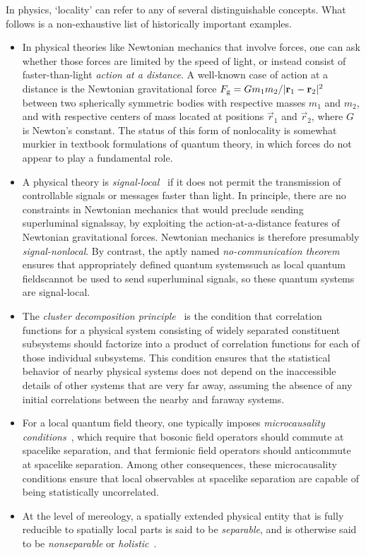 \documentclass[twoside,twocolumn,english,prl,superscriptaddress,nobibnotes,nofootinbib]{revtex4-2}
\begin{document}
In physics, \textquoteleft locality\textquoteright{} can refer to
any of several distinguishable concepts. What follows is a non-exhaustive
list of historically important examples.
\begin{itemize}
\item In physical theories like Newtonian mechanics that involve forces,
one can ask whether those forces are limited by the speed of light,
or instead consist of faster-than-light \emph{action at a distance}.
A well-known case of action at a distance is the Newtonian gravitational
force $F_{\textrm{g}}=Gm_{1}m_{2}/\vert\mathbf{r}_{1}-\mathbf{r}_{2}\vert^{2}$
between two spherically symmetric bodies with respective masses $m_{1}$
and $m_{2}$, and with respective centers of mass located at positions
$\vec r_{1}$ and $\vec r_{2}$, where $G$ is Newton's constant.
The status of this form of nonlocality is somewhat murkier in textbook
formulations of quantum theory, in which forces do not appear to play
a fundamental role.
\item A physical theory is \emph{signal-local}~\citep{Skyrms:1982cdalc,Skyrms:1984elfm}
if it does not permit the transmission of controllable signals or
messages faster than light. In principle, there are no constraints
in Newtonian mechanics that would preclude sending superluminal signals\textemdash say,
by exploiting the action-at-a-distance features of Newtonian gravitational
forces. Newtonian mechanics is therefore presumably \emph{signal-nonlocal}.
By contrast, the aptly named \emph{no-communication theorem}~\citep{GhirardiRiminiWeber:1980agaastttqmmp,Jordan:1983qcdnts}
ensures that appropriately defined quantum systems\textemdash such
as local quantum fields\textemdash cannot be used to send superluminal
signals, so these quantum systems are signal-local.
\item The \emph{cluster decomposition principle}~\citep{WichmannCrichton:1963cdpotsm,Weinberg:1996tqtfi}
is the condition that correlation functions for a physical system
consisting of widely separated constituent subsystems should factorize
into a product of correlation functions for each of those individual
subsystems. This condition ensures that the statistical behavior of
nearby physical systems does not depend on the inaccessible details
of other systems that are very far away, assuming the absence of any
initial correlations between the nearby and faraway systems.
\item For a local quantum field theory, one typically imposes \emph{microcausality conditions}~\citep{Weinberg:1996tqtfi},
which require that bosonic field operators should commute at spacelike
separation, and that fermionic field operators should anticommute
at spacelike separation. Among other consequences, these microcausality
conditions ensure that local observables at spacelike separation are
capable of being statistically uncorrelated.
\item At the level of mereology, a spatially extended physical entity that
is fully reducible to spatially local parts is said to be \emph{separable},
and is otherwise said to be \emph{nonseparable} or \emph{holistic}~\citep{Howard:1985eolas,Howard:1989hsatmiotbe}.
\end{itemize}
\end{document}
